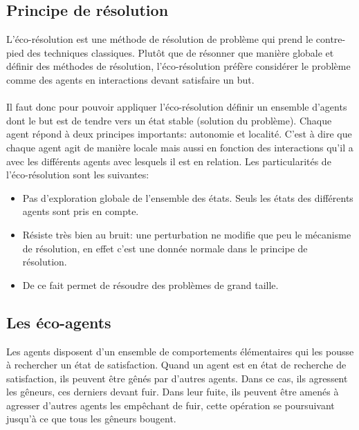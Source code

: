        \subsection{Principe de résolution}
            L'éco-résolution est une méthode de résolution de problème qui prend le contre-pied des techniques classiques. Plutôt que de résonner que manière globale et définir des méthodes de résolution, l'éco-résolution préfère considérer le problème comme des agents en interactions devant satisfaire un but. \\ \\
            Il faut donc pour pouvoir appliquer l'éco-résolution définir un ensemble d'agents dont le but est de tendre vers un état stable (solution du problème). Chaque agent répond à deux principes importants: autonomie et localité. C'est à dire que chaque agent agit de manière locale mais aussi en fonction des interactions qu'il a avec les différents agents avec lesquels il est en relation.
            Les particularités de l'éco-résolution sont les suivantes:
            \begin{itemize}
            \item Pas d'exploration globale de l'ensemble des états. Seuls les états des différents agents sont pris en compte. 
            \item Résiste très bien au bruit: une perturbation ne modifie que peu le mécanisme de résolution, en effet c'est une donnée normale dans le principe de résolution.
            \item De ce fait permet de résoudre des problèmes de grand taille. 
            \end{itemize}

        \subsection{Les éco-agents}
            Les agents disposent d'un ensemble de comportements élémentaires qui les pousse à rechercher un état de satisfaction. Quand un agent est en état de recherche de satisfaction, ils peuvent être gênés par d'autres agents. Dans ce cas, ils agressent les gêneurs, ces derniers devant fuir.  Dans leur fuite, ils peuvent être amenés à agresser d'autres agents les empêchant de fuir, cette opération se poursuivant jusqu'à ce que tous les gêneurs bougent. \\

